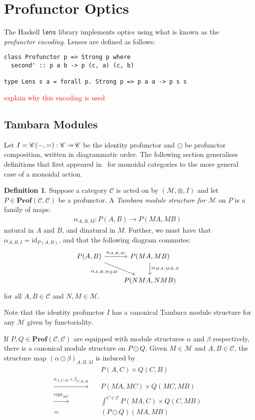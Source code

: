 \documentclass[11pt,a4paper]{article}
\theoremstyle{plain}
\theoremstyle{definition}
\newtheorem{definition}[theorem]{Definition}
\newcommand{\C}{\mathscr{C}}
\newcommand{\M}{\mathscr{M}}
\newcommand{\lenslib}{\texttt{lens}}
\newcommand{\Prof}{\mathbf{Prof}}
\newcommand{\id}{\mathrm{id}}
\DeclareMathOperator{\copr}{copr}
\newcommand{\hto}{\ensuremath{\,\mathaccent\shortmid\rightarrow\,}}
\newcommand{\todo}[1]{\textcolor{red}{\small #1}}
\begin{document}
\section{Profunctor Optics}\label{sec:profunctor-optics}
The Haskell \lenslib{} library implements optics using what is known as the \emph{profunctor encoding}. Lenses are defined as follows:

\begin{verbatim}
class Profunctor p => Strong p where
  second' :: p a b -> p (c, a) (c, b)

type Lens s a = forall p. Strong p => p a a -> p s s
\end{verbatim}

\todo{explain why this encoding is used}

\subsection{Tambara Modules}
Let $I = \C(-,{=}) : \C \hto \C$ be the identity profunctor and $\odot$ be profunctor composition, written in diagrammatic order. The following section generalises definitions that first appeared in~\cite[Section 3]{Doubles} for monoidal categories to the more general case of a monoidal action.

\begin{definition}
  Suppose a category $\C$ is acted on by $(\M, \otimes, I)$ and let $P \in \Prof(\C, \C)$ be a profunctor. A \emph{Tambara module structure for $\M$} on $P$ is a family of maps:
  \begin{align*}
    \alpha_{A,B,M} : P(A,B) \to P(MA, MB)
  \end{align*}
  natural in $A$ and $B$, and dinatural in $M$. Further, we must have that $\alpha_{A,B,I} = \id_{P(A,B)}$, and that the following diagram commutes:
  \[
    \begin{tikzcd}
      P(A,B) \ar[r, "\alpha_{A,B,M}"] \ar[dr, "\alpha_{A, B, N \otimes M}" below left] & P(MA, MB) \ar[d, "\alpha_{MA, MB, N}" right] \\
      & P(NMA, NMB)
    \end{tikzcd}
  \]
  for all $A, B \in \C$ and $N, M \in \M$.
\end{definition}

Note that the identity profunctor $I$ has a canonical Tambara module structure for any $\M$ given by functoriality.

If $P, Q \in \Prof(\C, \C)$ are equipped with module structures $\alpha$ and $\beta$ respectively, there is a canonical module structure on $P \odot Q$. Given $M \in \M$ and $A,B \in \C$, the structure map $(\alpha \odot \beta)_{A,B,M}$ is induced by
\begin{align*}
  &P(A,C) \times Q(C,B)  \\
  \xrightarrow{\alpha_{A,C,M} \times \beta_{C,B,M}} \quad& P(MA, MC) \times Q(MC, MB) \\
  \xrightarrow{\copr_{MC}} \quad&\int^{C \in \C} P(MA, C) \times Q(C, MB) \\
  = \quad&(P \odot Q)(MA, MB)
\end{align*}
\end{document}
